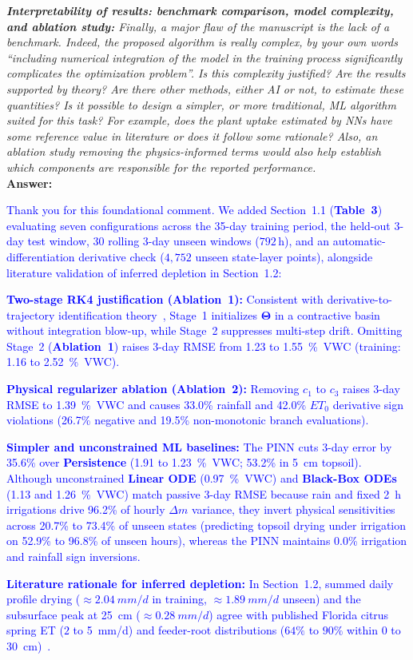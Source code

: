 \documentclass[10pt]{article}
\newcommand{\query}[2][]{\ifthenelse{\equal{#1}{}}{}{\textbf{#1:}~}\emph{#2}}
\newcommand{\ans}[1]{\textbf{Answer:~}#1}
\begin{document}
\query[R-1.3d]{\textbf{Interpretability of results: benchmark comparison, model complexity, and ablation study:} Finally, a major flaw of the manuscript is the lack of a benchmark. Indeed, the proposed algorithm is really complex, by your own words ``including numerical integration of the model in the training process significantly complicates the optimization problem''. Is this complexity justified? Are the results supported by theory? Are there other methods, either AI or not, to estimate these quantities? Is it possible to design a simpler, or more traditional, ML algorithm suited for this task? For example, does the plant uptake estimated by NNs have some reference value in literature or does it follow some rationale? Also, an ablation study removing the physics-informed terms would also help establish which components are responsible for the reported performance.}\\
\ans{\textcolor{blue}{Thank you for this foundational comment. We added Section~1.1 (\textbf{Table~3}) evaluating seven configurations across the 35-day training period, the held-out 3-day test window, 30 rolling 3-day unseen windows ($792\,\mathrm{h}$), and an automatic-differentiation derivative check ($4{,}752$ unseen state-layer points), alongside literature validation of inferred depletion in Section~1.2:
\begin{compactenum}[1.]
\item \textbf{Two-stage RK4 justification (Ablation~1):} Consistent with derivative-to-trajectory identification theory~\cite{Ribeiro2020, Aguirre2010, Bradley2021}, Stage~1 initializes $\boldsymbol{\Theta}$ in a contractive basin without integration blow-up, while Stage~2 suppresses multi-step drift. Omitting Stage~2 (\textbf{Ablation~1}) raises 3-day RMSE from \SI{1.23}{} to \SI{1.55}{\%VWC} (training: \SI{1.16}{} to \SI{2.52}{\%VWC}).
\item \textbf{Physical regularizer ablation (Ablation~2):} Removing $c_1$ to $c_3$ raises 3-day RMSE to \SI{1.39}{\%VWC} and causes 33.0\% rainfall and 42.0\% $ET_0$ derivative sign violations (26.7\% negative and 19.5\% non-monotonic branch evaluations).
\item \textbf{Simpler and unconstrained ML baselines:} The PINN cuts 3-day error by 35.6\% over \textbf{Persistence} (\SI{1.91}{} to \SI{1.23}{\%VWC}; 53.2\% in 5~\si{cm} topsoil). Although unconstrained \textbf{Linear ODE} (\SI{0.97}{\%VWC}) and \textbf{Black-Box ODEs} (\SI{1.13}{} and \SI{1.26}{\%VWC}) match passive 3-day RMSE because rain and fixed 2~\si{h} irrigations drive 96.2\% of hourly $\Delta m$ variance, they invert physical sensitivities across 20.7\% to 73.4\% of unseen states (predicting topsoil drying under irrigation on 52.9\% to 96.8\% of unseen hours), whereas the PINN maintains 0.0\% irrigation and rainfall sign inversions.
\item \textbf{Literature rationale for inferred depletion:} In Section~1.2, summed daily profile drying ($\approx\SI{2.04}{mm/d}$ in training, $\approx\SI{1.89}{mm/d}$ unseen) and the subsurface peak at 25~\si{cm} ($\approx\SI{0.28}{mm/d}$) agree with published Florida citrus spring ET ($2$ to \SI{5}{mm/d}) and feeder-root distributions ($64\%$ to $90\%$ within 0 to 30~\si{cm})~\cite{Morgan2006, Kadyampakeni2014}.
\end{compactenum}}}
\end{document}
